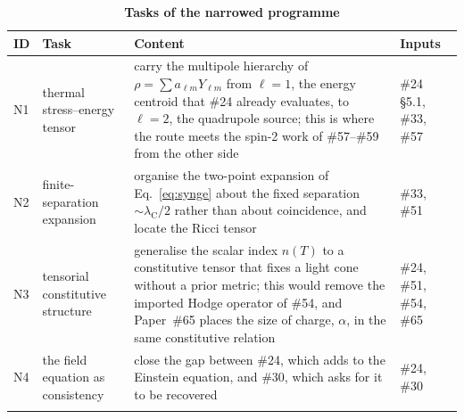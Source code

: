 \documentclass[%
 reprint, amsmath,amssymb, aps, prb, ]{revtex4-2}
\numberwithin{equation}{section}
\newcommand{\lambdaC}{\lambda_{\text{C}}}
\begin{document}
\begin{table}[t!]
\centering
\caption{\textbf{Tasks of the narrowed programme}}
\label{tab:ntasks}
\renewcommand{\arraystretch}{1.4}
\setlength{\tabcolsep}{7pt}
\begin{tabular}{>{\raggedright\arraybackslash}p{0.7cm}>{\raggedright\arraybackslash}p{3.0cm}>{\raggedright\arraybackslash}p{9.8cm}>{\raggedright\arraybackslash}p{2.4cm}}
\toprule
\textbf{ID} & \textbf{Task} & \textbf{Content} & \textbf{Inputs} \\
\midrule
N1 & thermal stress--energy tensor & carry the multipole hierarchy of $\rho = \sum a_{\ell m}Y_{\ell m}$ from $\ell=1$, the energy centroid that \#24 already evaluates, to $\ell=2$, the quadrupole source; this is where the route meets the spin-2 work of \#57--\#59 from the other side & \#24 \S5.1, \#33, \#57 \\
\addlinespace[0.15cm]
N2 & finite-separation expansion & organise the two-point expansion of Eq.~\eqref{eq:synge} about the fixed separation $\sim\lambdaC/2$ rather than about coincidence, and locate the Ricci tensor & \#33, \#51 \\
\addlinespace[0.15cm]
N3 & tensorial constitutive structure & generalise the scalar index $n(T)$ to a constitutive tensor that fixes a light cone without a prior metric; this would remove the imported Hodge operator of \#54, and Paper~\#65 places the size of charge, $\alpha$, in the same constitutive relation & \#24, \#51, \#54, \#65 \\
\addlinespace[0.15cm]
N4 & the field equation as consistency & close the gap between \#24, which adds to the Einstein equation, and \#30, which asks for it to be recovered & \#24, \#30 \\
\addlinespace[0.1cm]
\bottomrule
\end{tabular}
\end{table}
\end{document}
